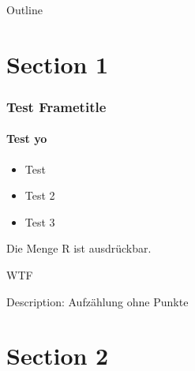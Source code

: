 \begin{frame}{}
	\titlepage
\end{frame}


\begin{frame}{Outline}\label{tableofcontents}
   \tableofcontents
\end{frame}







\section{Section 1}
\begin{frame}
	\frametitle{Test Frametitle}
	\framesubtitle{Test yo}

    \begin{itemize}
	\item Test
	\item Test 2
	\item Test 3
    \end{itemize}
    \begin{description}
      \item[${G_3}'$:] Die Menge R ist ausdrückbar.
      \item WTF
      \item [Das hier:] Description: Aufzählung ohne Punkte
    \end{description}
\end{frame}






\section{Section 2}
